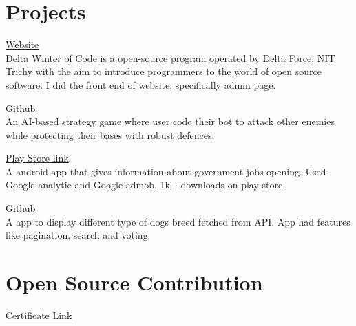 \documentclass[]{deedy-resume-openfont}
\begin{document}
\begin{minipage}[t]{0.69\textwidth}
\section{Projects}
\raggedright

\hfill \href{http://dwoc.io}{Website}\\
Delta Winter of Code is a open-source program operated by Delta Force, NIT Trichy with the aim to introduce programmers to the world of open source software.
I did the front end of website, specifically admin page.\\
\sectionsep

\hfill \href{https://github.com/delta/codecharacter-web-2022}{Github}\\
An AI-based strategy game where user code their bot to attack other enemies while protecting their bases with robust defences.\\
\sectionsep

\hfill \href{https://play.google.com/store/apps/details?id=com.amostrone.akash.sanjeevwebsolutions}{Play Store link}\\
A android app that gives information about government jobs opening. Used Google analytic and Google admob. 1k+ downloads on play store.\\
\sectionsep

\hfill \href{https://github.com/jaiakash/Pawsome}{Github}\\
A app to display different type of dogs breed fetched from API. App had features like pagination, search and voting\\
\sectionsep

%
%

\section{Open Source Contribution}
\href{https://kossiitkgp.org/public-files/KWoC/2021-Certificates/Student/jaiakash.pdf
}{Certificate Link}



\end{minipage}
\end{document}

